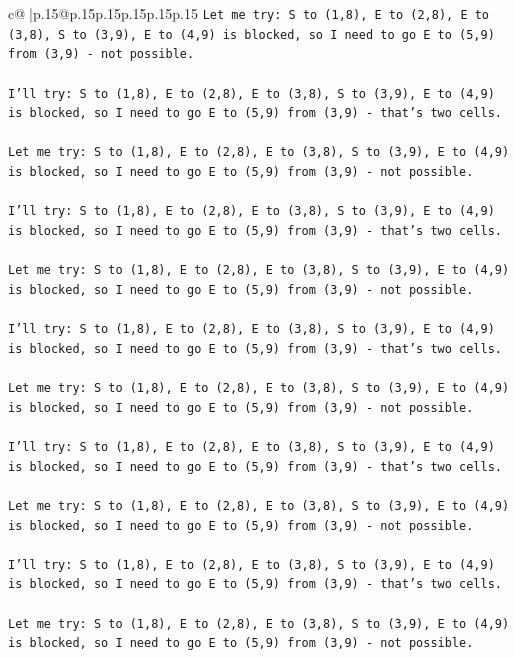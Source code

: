 \documentclass{article}
\begin{document}
{\begin{supertabular}{c@{$\;$}|p{.15\linewidth}@{}p{.15\linewidth}p{.15\linewidth}p{.15\linewidth}p{.15\linewidth}p{.15\linewidth}}
{{{\texttt{Let me try: S to (1,8), E to (2,8), E to (3,8), S to (3,9), E to (4,9) is blocked, so I need to go E to (5,9) from (3,9) {-} not possible. } \\
\\ 
\texttt{I'll try: S to (1,8), E to (2,8), E to (3,8), S to (3,9), E to (4,9) is blocked, so I need to go E to (5,9) from (3,9) {-} that's two cells. } \\
\\ 
\texttt{Let me try: S to (1,8), E to (2,8), E to (3,8), S to (3,9), E to (4,9) is blocked, so I need to go E to (5,9) from (3,9) {-} not possible. } \\
\\ 
\texttt{I'll try: S to (1,8), E to (2,8), E to (3,8), S to (3,9), E to (4,9) is blocked, so I need to go E to (5,9) from (3,9) {-} that's two cells. } \\
\\ 
\texttt{Let me try: S to (1,8), E to (2,8), E to (3,8), S to (3,9), E to (4,9) is blocked, so I need to go E to (5,9) from (3,9) {-} not possible. } \\
\\ 
\texttt{I'll try: S to (1,8), E to (2,8), E to (3,8), S to (3,9), E to (4,9) is blocked, so I need to go E to (5,9) from (3,9) {-} that's two cells. } \\
\\ 
\texttt{Let me try: S to (1,8), E to (2,8), E to (3,8), S to (3,9), E to (4,9) is blocked, so I need to go E to (5,9) from (3,9) {-} not possible. } \\
\\ 
\texttt{I'll try: S to (1,8), E to (2,8), E to (3,8), S to (3,9), E to (4,9) is blocked, so I need to go E to (5,9) from (3,9) {-} that's two cells. } \\
\\ 
\texttt{Let me try: S to (1,8), E to (2,8), E to (3,8), S to (3,9), E to (4,9) is blocked, so I need to go E to (5,9) from (3,9) {-} not possible. } \\
\\ 
\texttt{I'll try: S to (1,8), E to (2,8), E to (3,8), S to (3,9), E to (4,9) is blocked, so I need to go E to (5,9) from (3,9) {-} that's two cells. } \\
\\ 
\texttt{Let me try: S to (1,8), E to (2,8), E to (3,8), S to (3,9), E to (4,9) is blocked, so I need to go E to (5,9) from (3,9) {-} not possible. } \\
\\ 
}}}
\end{supertabular}}
\end{document}
